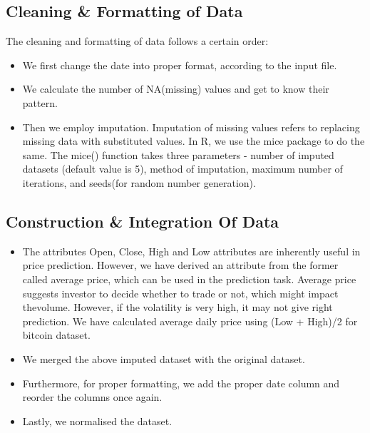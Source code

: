 \documentclass{article}
\begin{document}
\subsection{Cleaning \& Formatting of Data}
The cleaning and formatting of data follows a certain order:
\begin{itemize}
    \item We first change the date into proper format, according to the input file. 
    \item We calculate the number of NA(missing) values and get to know their pattern.
    \item Then we employ imputation. Imputation of missing values refers to replacing missing data with substituted values. In R, we use the mice package to do the same. The mice() function takes three parameters - number of imputed datasets (default value is 5), method of imputation, maximum number of iterations, and seeds(for random number generation).
\end{itemize}


\subsection{Construction \& Integration Of Data}
\begin{itemize}
\item The attributes Open, Close, High and Low attributes are inherently useful in price prediction. However, we have derived an attribute from the former called average price, which can be used in the prediction task. Average price suggests investor to decide whether to trade or not, which might impact thevolume. However, if the volatility is very high, it may not give right prediction.
We have calculated average daily price using (Low + High)/2 for bitcoin dataset.
\item We merged the above imputed dataset with the original dataset. 
\item Furthermore, for proper formatting, we add the proper date column and reorder the columns once again.
\item Lastly, we normalised the dataset.
\end{itemize}
\end{document}
